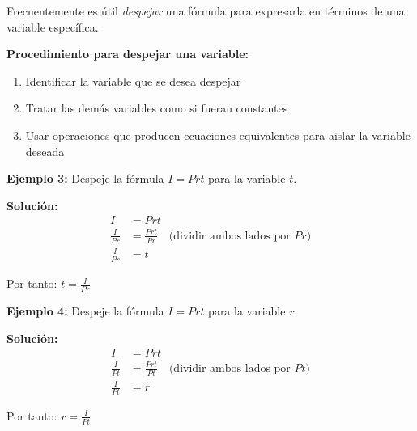 
Frecuentemente es útil \textit{despejar} una fórmula para expresarla en términos de una variable específica.

\textbf{Procedimiento para despejar una variable:}
\begin{enumerate}
\item Identificar la variable que se desea despejar
\item Tratar las demás variables como si fueran constantes
\item Usar operaciones que producen ecuaciones equivalentes para aislar la variable deseada
\end{enumerate}

\begin{center}
\end{center}

\begin{example}
\textbf{Ejemplo 3:} Despeje la fórmula $I = Prt$ para la variable $t$.

\textbf{Solución:}
\begin{align}
I &= Prt\\
\frac{I}{Pr} &= \frac{Prt}{Pr} \quad \text{(dividir ambos lados por $Pr$)}\\
\frac{I}{Pr} &= t
\end{align}

Por tanto: $t = \frac{I}{Pr}$
\end{example}

\begin{example}
\textbf{Ejemplo 4:} Despeje la fórmula $I = Prt$ para la variable $r$.

\textbf{Solución:}
\begin{align}
I &= Prt\\
\frac{I}{Pt} &= \frac{Prt}{Pt} \quad \text{(dividir ambos lados por $Pt$)}\\
\frac{I}{Pt} &= r
\end{align}

Por tanto: $r = \frac{I}{Pt}$
\end{example}

